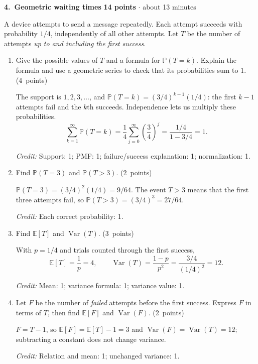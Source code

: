 \documentclass[11pt,letterpaper]{article}
\newcommand{\Prob}{\mathbb P}
\newcommand{\E}{\mathbb E}
\DeclareMathOperator{\Var}{Var}
\newcommand{\partpts}[1]{\unskip\nobreak\hspace{.3em}%
  \mbox{\small\color{muted}(#1 points)}}
\newcommand{\credit}[1]{\par{\footnotesize\color{muted}\textit{Credit:} #1}}
\newcommand{\problem}[4]{\par\addvspace{8pt}%
  {\large\bfseries\color{indigo}#1.\ #2}\hfill
  {\small\color{muted}\textbf{#3 points} $\cdot$ about #4 minutes}\par\nobreak}
\begin{document}
\newpage
\problem{4}{Geometric waiting times}{14}{13}
A device attempts to send a message repeatedly. Each attempt succeeds
with probability $1/4$, independently of all other attempts. Let $T$ be
the number of attempts \emph{up to and including the first success}.
\begin{enumerate}
  \item Give the possible values of $T$ and a formula for
  $\Prob(T=k)$. Explain the formula and use a geometric series to check
  that its probabilities sum to $1$. \partpts{4}
  \begin{solution}[1.1in]
    The support is $1,2,3,\ldots$, and
    $\Prob(T=k)=(3/4)^{k-1}(1/4)$: the first $k-1$ attempts fail and
    the $k$th succeeds. Independence lets us multiply these probabilities.
    \[
      \sum_{k=1}^{\infty}\Prob(T=k)
        =\frac14\sum_{j=0}^{\infty}\left(\frac34\right)^j
        =\frac{1/4}{1-3/4}=1.
    \]
    \credit{Support: 1; PMF: 1; failure/success explanation: 1;
    normalization: 1.}
  \end{solution}

  \item Find $\Prob(T=3)$ and $\Prob(T>3)$. \partpts{2}
  \begin{solution}[.75in]
    $\Prob(T=3)=(3/4)^2(1/4)=9/64$.
    The event $T>3$ means that the first three attempts fail, so
    $\Prob(T>3)=(3/4)^3=27/64$.
    \credit{Each correct probability: 1.}
  \end{solution}

  \item Find $\E[T]$ and $\Var(T)$. \partpts{3}
  \begin{solution}[.8in]
    With $p=1/4$ and trials counted through the first success,
    \[
      \E[T]=\frac1p=4,\qquad
      \Var(T)=\frac{1-p}{p^2}=\frac{3/4}{(1/4)^2}=12.
    \]
    \credit{Mean: 1; variance formula: 1; variance value: 1.}
  \end{solution}

  \item Let $F$ be the number of \emph{failed} attempts before the first
  success. Express $F$ in terms of $T$, then find $\E[F]$ and $\Var(F)$.
  \partpts{2}
  \begin{solution}[.65in]
    $F=T-1$, so $\E[F]=\E[T]-1=3$ and
    $\Var(F)=\Var(T)=12$; subtracting a constant does not change variance.
    \credit{Relation and mean: 1; unchanged variance: 1.}
  \end{solution}


\end{enumerate}
\end{document}
